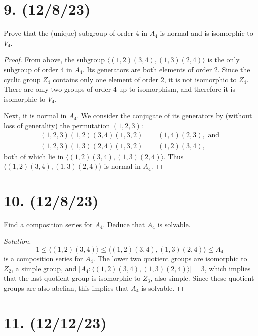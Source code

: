 \documentclass{article}
\begin{document}
\section*{9. (12/8/23)}

Prove that the (unique) subgroup of order 4 in $A_4$ is normal and is isomorphic to $V_4$.

\begin{proof}
    From above, the subgroup $\langle (1, 2)(3, 4), (1, 3)(2, 4) \rangle$ is the only subgroup of order 4 in $A_4$. Its generators are both elements of order 2. Since the cyclic group $Z_4$ contains only one element of order 2, it is not isomorphic to $Z_4$. There are only two groups of order 4 up to isomorphism, and therefore it is isomorphic to $V_4$.

    Next, it is normal in $A_4$. We consider the conjugate of its generators by (without loss of generality) the permutation $(1, 2, 3)$:
    \begin{align*}
        (1, 2, 3)(1, 2)(3, 4)(1, 3, 2) &= (1, 4)(2, 3), \text{ and} \\
        (1, 2, 3)(1, 3)(2, 4)(1, 3, 2) &= (1, 2)(3, 4),
    \end{align*}
    both of which lie in $\langle (1, 2)(3, 4), (1, 3)(2, 4) \rangle$. Thus $\langle (1, 2)(3, 4), (1, 3)(2, 4) \rangle$ is normal in $A_4$.
\end{proof}

\section*{10. (12/8/23)}

Find a composition series for $A_4$. Deduce that $A_4$ is solvable.

\begin{proof}[Solution]
    \begin{equation*}
        1 \leq \langle (1, 2)(3, 4) \rangle \leq \langle (1, 2)(3, 4), (1, 3)(2, 4) \rangle \leq A_4
    \end{equation*}
    is a composition series for $A_4$. The lower two quotient groups are isomorphic to $Z_2$, a simple group, and $|A_4:\langle (1, 2)(3, 4), (1, 3)(2, 4) \rangle| = 3$, which implies that the last quotient group is isomorphic to $Z_3$, also simple. Since these quotient groups are also abelian, this implies that $A_4$ is solvable.
\end{proof}

\section*{11. (12/12/23)}
\end{document}

